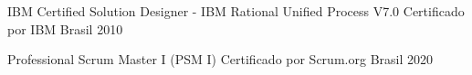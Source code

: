 
\begin{cvhonors}

\cvhonor
{IBM Certified Solution Designer - IBM Rational Unified Process V7.0} %
{Certificado por IBM} %
{Brasil}
{2010} %

\cvhonor
{Professional Scrum Master I (PSM I)} %
{Certificado por Scrum.org} %
{Brasil}
{2020} %

\end{cvhonors}